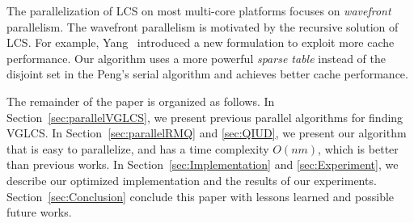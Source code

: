 The parallelization of LCS on most multi-core platforms focuses on
{\em wavefront} parallelism.  The wavefront parallelism is motivated
by the recursive solution of LCS.  For example,
Yang~\cite{Yang2010AnEP} introduced a new formulation to exploit more
cache performance.  Our algorithm uses a more powerful {\em sparse
  table} instead of the disjoint set in the Peng's serial algorithm
and achieves better cache performance.

The remainder of the paper is organized as follows.  In
Section~\ref{sec:parallelVGLCS}, we present previous parallel algorithms
for finding VGLCS.  In Section~\ref{sec:parallelRMQ} and \ref{sec:QIUD},
we present our algorithm that is easy to parallelize, and has a time
complexity $O(nm)$, which is better than previous works.  In
Section~\ref{sec:Implementation} and \ref{sec:Experiment}, we describe
our optimized implementation and the results of our experiments.
Section~\ref{sec:Conclusion} conclude this paper with lessons learned
and possible future works.

